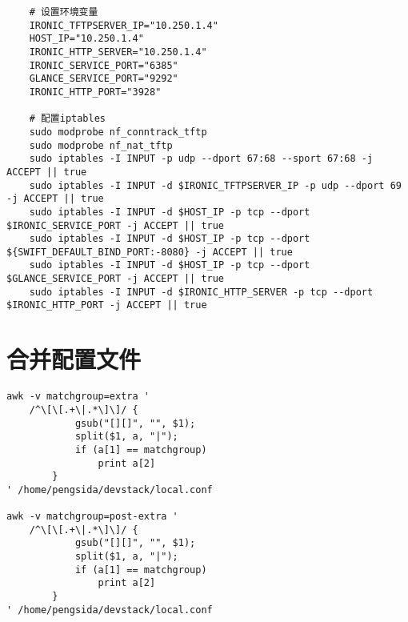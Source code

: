 \documentclass[a4paper,left=1.5cm,right=1.5cm,11pt]{article}
\begin{document}
\begin{lstlisting}
	# 设置环境变量
	IRONIC_TFTPSERVER_IP="10.250.1.4"
	HOST_IP="10.250.1.4"
	IRONIC_HTTP_SERVER="10.250.1.4"
	IRONIC_SERVICE_PORT="6385"
	GLANCE_SERVICE_PORT="9292"
	IRONIC_HTTP_PORT="3928"

	# 配置iptables
	sudo modprobe nf_conntrack_tftp
	sudo modprobe nf_nat_tftp
	sudo iptables -I INPUT -p udp --dport 67:68 --sport 67:68 -j ACCEPT || true
    sudo iptables -I INPUT -d $IRONIC_TFTPSERVER_IP -p udp --dport 69 -j ACCEPT || true
    sudo iptables -I INPUT -d $HOST_IP -p tcp --dport $IRONIC_SERVICE_PORT -j ACCEPT || true
	sudo iptables -I INPUT -d $HOST_IP -p tcp --dport ${SWIFT_DEFAULT_BIND_PORT:-8080} -j ACCEPT || true
	sudo iptables -I INPUT -d $HOST_IP -p tcp --dport $GLANCE_SERVICE_PORT -j ACCEPT || true
	sudo iptables -I INPUT -d $IRONIC_HTTP_SERVER -p tcp --dport $IRONIC_HTTP_PORT -j ACCEPT || true
	\end{lstlisting}

\section{合并配置文件}
	\begin{lstlisting}
awk -v matchgroup=extra '
	/^\[\[.+\|.*\]\]/ {
            gsub("[][]", "", $1);
            split($1, a, "|");
            if (a[1] == matchgroup)
                print a[2]
        }
' /home/pengsida/devstack/local.conf

awk -v matchgroup=post-extra '
	/^\[\[.+\|.*\]\]/ {
            gsub("[][]", "", $1);
            split($1, a, "|");
            if (a[1] == matchgroup)
                print a[2]
        }
' /home/pengsida/devstack/local.conf
	\end{lstlisting}
\end{document}
